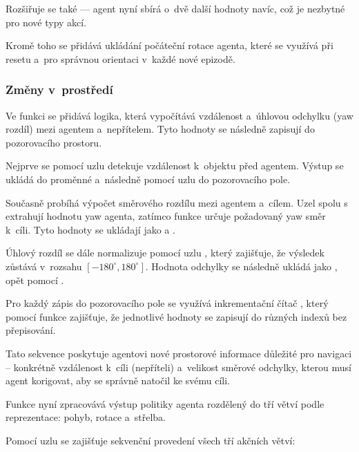 Rozšiřuje se také  — agent nyní sbírá o~dvě další hodnoty navíc, což je nezbytné pro nové typy akcí.

Kromě toho se přidává ukládání počáteční rotace agenta, které se využívá při resetu a~pro správnou orientaci v~každé nové epizodě.

\newpage

\subsubsection{Změny v~prostředí}
Ve funkci  se přidává logika, která vypočítává vzdálenost a~úhlovou odchylku (yaw rozdíl) mezi agentem a~nepřítelem. Tyto hodnoty se následně zapisují do pozorovacího prostoru.

Nejprve se pomocí uzlu  detekuje vzdálenost k~objektu před agentem. Výstup  se ukládá do proměnné  a~následně pomocí uzlu  do pozorovacího pole.

Současně probíhá výpočet směrového rozdílu mezi agentem a~cílem. Uzel  spolu s  extrahují hodnotu yaw agenta, zatímco funkce  určuje požadovaný yaw směr k~cíli. Tyto hodnoty se ukládají jako  a .

Úhlový rozdíl se dále normalizuje pomocí uzlu , který zajišťuje, že výsledek zůstává v~rozsahu $[-180^\circ, 180^\circ]$. Hodnota odchylky se následně ukládá jako , opět pomocí .

Pro každý zápis do pozorovacího pole se využívá inkrementační čítač , který pomocí funkce  zajišťuje, že jednotlivé hodnoty se zapisují do různých indexů bez přepisování.

Tato sekvence poskytuje agentovi nové prostorové informace důležité pro navigaci – konkrétně vzdálenost k~cíli (nepříteli) a~velikost směrové odchylky, kterou musí agent korigovat, aby se správně natočil ke svému cíli.

Funkce  nyní zpracovává výstup politiky agenta rozdělený do tří větví podle  reprezentace: pohyb, rotace a~střelba.

\newpage

Pomocí uzlu  se zajišťuje sekvenční provedení všech tří akčních větví:

